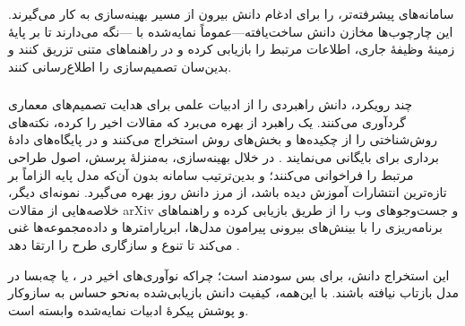 سامانه‌های پیشرفته‌تر،  را برای ادغام دانش بیرون از مسیر بهینه‌سازی به کار می‌گیرند. این چارچوب‌ها مخازن دانش ساخت‌یافته—عموماً  نمایه‌شده با —نگه می‌دارند تا بر پایهٔ زمینهٔ وظیفهٔ جاری، اطلاعات مرتبط را بازیابی کرده و در راهنماهای متنی تزریق کنند و بدین‌سان تصمیم‌سازی را اطلاع‌رسانی کنند.

\subsubsection{\protect{}}

چند رویکرد، دانش راهبردی را از ادبیات علمی برای هدایت تصمیم‌های معماری گردآوری می‌کنند. یک راهبرد از  بهره می‌برد که مقالات اخیر را  کرده، نکته‌های روش‌شناختی را از چکیده‌ها و بخش‌های روش استخراج می‌کنند و در پایگاه‌های دادهٔ برداری برای  بایگانی می‌نمایند \cite{Yang2025NADER}. در خلال بهینه‌سازی،  به‌منزلهٔ پرسش، اصول طراحی مرتبط را فراخوانی می‌کنند؛ و بدین‌ترتیب سامانه بدون آن‌که مدل پایه الزاماً بر تازه‌ترین انتشارات آموزش دیده باشد، از مرز دانش روز بهره می‌گیرد. نمونه‌ای دیگر، خلاصه‌هایی از مقالات arXiv و جست‌وجوهای وب را از طریق  بازیابی کرده و راهنماهای برنامه‌ریزی را با بینش‌های بیرونی پیرامون مدل‌ها، ابرپارامترها و داده‌مجموعه‌ها غنی می‌کند تا تنوع و سازگاری طرح را ارتقا دهد \cite{trirat2025automlagent}.

این استخراج دانش، برای  بس سودمند است؛ چراکه نوآوری‌های اخیر در ،  یا  چه‌بسا در  مدل بازتاب نیافته باشند. با این‌همه، کیفیت دانش بازیابی‌شده به‌نحو حساس به سازوکار  و پوشش پیکرهٔ ادبیات نمایه‌شده وابسته است.

\subsubsection{\protect{}}

